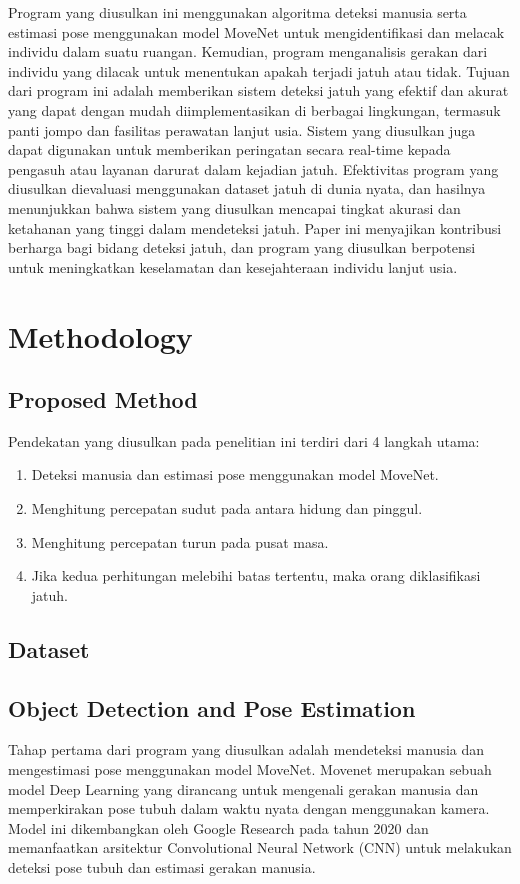 \documentclass[conference]{IEEEtran}
\begin{document}
Program yang diusulkan ini menggunakan algoritma deteksi manusia serta estimasi pose menggunakan model MoveNet untuk mengidentifikasi dan melacak individu dalam suatu ruangan. Kemudian, program menganalisis gerakan dari individu yang dilacak untuk menentukan apakah terjadi jatuh atau tidak. Tujuan dari program ini adalah memberikan sistem deteksi jatuh yang efektif dan akurat yang dapat dengan mudah diimplementasikan di berbagai lingkungan, termasuk panti jompo dan fasilitas perawatan lanjut usia. Sistem yang diusulkan juga dapat digunakan untuk memberikan peringatan secara real-time kepada pengasuh atau layanan darurat dalam kejadian jatuh. Efektivitas program yang diusulkan dievaluasi menggunakan dataset jatuh di dunia nyata, dan hasilnya menunjukkan bahwa sistem yang diusulkan mencapai tingkat akurasi dan ketahanan yang tinggi dalam mendeteksi jatuh. Paper ini menyajikan kontribusi berharga bagi bidang deteksi jatuh, dan program yang diusulkan berpotensi untuk meningkatkan keselamatan dan kesejahteraan individu lanjut usia.

\section{Methodology}

\subsection{Proposed Method}
Pendekatan yang diusulkan pada penelitian ini terdiri dari 4 langkah utama:
\begin{enumerate}
    \item Deteksi manusia dan estimasi pose menggunakan model MoveNet.
    \item Menghitung percepatan sudut pada antara hidung dan pinggul.
    \item Menghitung percepatan turun pada pusat masa.
    \item Jika kedua perhitungan melebihi batas tertentu, maka orang diklasifikasi jatuh.
\end{enumerate}

\subsection{Dataset}


\subsection{Object Detection and Pose Estimation}
Tahap pertama dari program yang diusulkan adalah mendeteksi manusia dan mengestimasi pose menggunakan model MoveNet. Movenet merupakan sebuah model Deep Learning yang dirancang untuk mengenali gerakan manusia dan memperkirakan pose tubuh dalam waktu nyata dengan menggunakan kamera. Model ini dikembangkan oleh Google Research pada tahun 2020 dan memanfaatkan arsitektur Convolutional Neural Network (CNN) untuk melakukan deteksi pose tubuh dan estimasi gerakan manusia.
\end{document}
